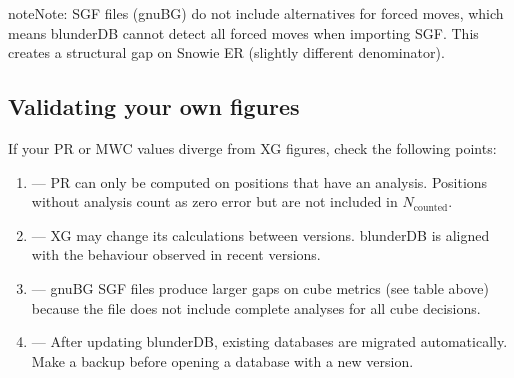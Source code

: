 \documentclass[letterpaper,10pt,english]{sphinxmanual}
\begin{document}
\begin{sphinxadmonition}{note}{Note:}
\sphinxAtStartPar
SGF files (gnuBG) do not include alternatives for forced moves, which means blunderDB cannot detect all forced moves when importing SGF. This creates a structural gap on Snowie ER (slightly different denominator).
\end{sphinxadmonition}


\subsection{Validating your own figures}
\label{\detokenize{stats_parity:valider-vos-propres-chiffres}}
\sphinxAtStartPar
If your PR or MWC values diverge from XG figures, check the following points:
\begin{enumerate}
%
\item {} 
\sphinxAtStartPar
{} — PR can only be computed on positions that have an analysis. Positions without analysis count as zero error but are not included in \(N_\text{counted}\).

\item {} 
\sphinxAtStartPar
{} — XG may change its calculations between versions. blunderDB is aligned with the behaviour observed in recent versions.

\item {} 
\sphinxAtStartPar
{} — gnuBG SGF files produce larger gaps on cube metrics (see table above) because the file does not include complete analyses for all cube decisions.

\item {} 
\sphinxAtStartPar
{} — After updating blunderDB, existing databases are migrated automatically. Make a backup before opening a database with a new version.

\end{enumerate}
\end{document}
